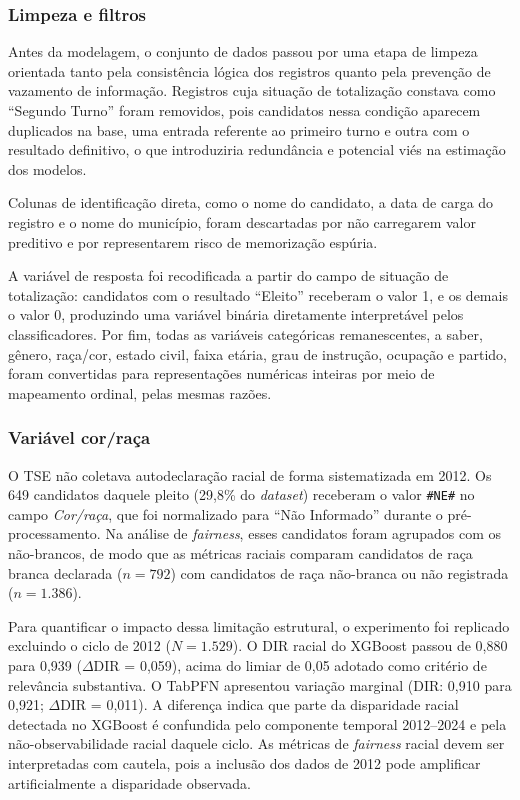 \documentclass[12pt]{article}
\begin{document}
\subsubsection{Limpeza e filtros}

Antes da modelagem, o conjunto de dados passou por uma etapa de limpeza orientada tanto pela
consistência lógica dos registros quanto pela prevenção de vazamento de informação. Registros
cuja situação de totalização constava como ``Segundo Turno'' foram removidos, pois candidatos nessa
condição aparecem duplicados na base, uma entrada referente ao primeiro turno e outra com o
resultado definitivo, o que introduziria redundância e potencial viés na estimação dos modelos.

Colunas de identificação direta, como o nome do candidato, a data de carga do registro e o nome do município, foram
descartadas por não carregarem valor preditivo e por representarem risco de memorização espúria.

A variável de resposta foi recodificada a partir do campo de situação de totalização: candidatos
com o resultado ``Eleito'' receberam o valor 1, e os demais o valor 0, produzindo uma variável
binária diretamente interpretável pelos classificadores. Por fim, todas as variáveis categóricas
remanescentes, a saber, gênero, raça/cor, estado civil, faixa etária, grau de instrução, ocupação e partido,
foram convertidas para representações numéricas inteiras por meio de mapeamento ordinal, pelas
mesmas razões.

\subsubsection{Variável cor/raça}

O TSE não coletava autodeclaração racial de forma sistematizada em 2012. Os 649 candidatos daquele pleito (29,8\% do \textit{dataset}) receberam o valor \texttt{\#NE\#} no campo \textit{Cor/raça}, que foi normalizado para ``Não Informado'' durante o pré-processamento. Na análise de \textit{fairness}, esses candidatos foram agrupados com os não-brancos, de modo que as métricas raciais comparam candidatos de raça branca declarada ($n=792$) com candidatos de raça não-branca ou não registrada ($n=1.386$).

Para quantificar o impacto dessa limitação estrutural, o experimento foi replicado excluindo o ciclo de 2012 ($N = 1.529$). O DIR racial do XGBoost passou de 0,880 para 0,939 ($\Delta$DIR = 0,059), acima do limiar de 0,05 adotado como critério de relevância substantiva. O TabPFN apresentou variação marginal (DIR: 0,910 para 0,921; $\Delta$DIR = 0,011). A diferença indica que parte da disparidade racial detectada no XGBoost é confundida pelo componente temporal 2012--2024 e pela não-observabilidade racial daquele ciclo. As métricas de \textit{fairness} racial devem ser interpretadas com cautela, pois a inclusão dos dados de 2012 pode amplificar artificialmente a disparidade observada.
\end{document}
